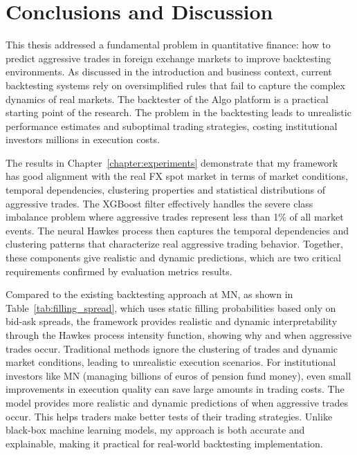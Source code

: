 \chapter{Conclusions and Discussion}\label{chapter:cd}
This thesis addressed a fundamental problem in quantitative finance: how to predict aggressive trades in foreign exchange markets to improve backtesting environments. As discussed in the introduction and business context, current backtesting systems rely on oversimplified rules that fail to capture the complex dynamics of real markets. The backtester of the Algo platform is a practical starting point of the research. The problem in the backtesting leads to unrealistic performance estimates and suboptimal trading strategies, costing institutional investors millions in execution costs.

The results in Chapter~\ref{chapter:experiments} demonstrate that my framework has good alignment with the real FX spot market in terms of market conditions, temporal dependencies, clustering properties and statistical distributions of aggressive trades. The XGBoost filter effectively handles the severe class imbalance problem where aggressive trades represent less than 1\% of all market events. The neural Hawkes process then captures the temporal dependencies and clustering patterns that characterize real aggressive trading behavior. Together, these components give realistic and dynamic predictions, which are two critical requirements confirmed by evaluation metrics results.

Compared to the existing backtesting approach at MN, as shown in Table~\ref{tab:filling_spread}, which uses static filling probabilities based only on bid-ask spreads, the framework provides realistic and dynamic interpretability through the Hawkes process intensity function, showing why and when aggressive trades occur. Traditional methods ignore the clustering of trades and dynamic market conditions, leading to unrealistic execution scenarios. For institutional investors like MN (managing billions of euros of pension fund money), even small improvements in execution quality can save large amounts in trading costs. The model provides more realistic and dynamic predictions of when aggressive trades occur. This helps traders make better tests of their trading strategies. Unlike black-box machine learning models, my approach is both accurate and explainable, making it practical for real-world backtesting implementation.


